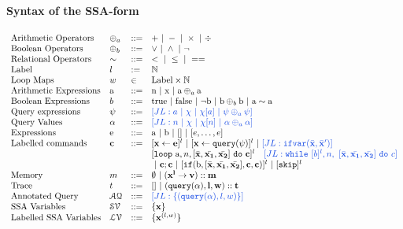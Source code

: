 \documentclass[a4paper,11pt]{article}
\begin{document}
\paragraph{Syntax of the SSA-form}
\[
\begin{array}{llll}
 \mbox{Arithmetic Operators} & \oplus_a & ::= & + ~|~ - ~|~ \times 
%
~|~ \div \\  
  \mbox{Boolean Operators} & \oplus_b & ::= & \lor ~|~ \land ~|~ \neg\\
   \mbox{Relational Operators} & \sim & ::= & < ~|~ \leq ~|~ == \\  
 \mbox{Label} & l & := & \mathbb{N} \\ 
 \mbox{Loop Maps} & w & \in & \mbox{Label} \times \mathbb{N} \\
\mbox{Arithmetic Expressions} & \saexpr & ::= & 
	\textrm{n} ~|~ \textrm{x} ~|~ \saexpr \oplus_a \saexpr  \\
\mbox{Boolean Expressions} & \bexpr & ::= & 
	\textrm{true} ~|~ \textrm{false}  ~|~ \neg \sbexpr
	 ~|~ \sbexpr \oplus_b \sbexpr
	~|~ \saexpr \sim \saexpr 
	\\
\mbox{Query expressions} & \qexpr & ::= 
& \jl{ \aexpr ~|~ \chi ~|~ \chi[\aexpr] ~|~ \qexpr \oplus_a \qexpr} 
\\
\mbox{Query Values} & \qval & ::= 
& \jl{ n ~|~ \chi ~|~ \chi[n] ~|~ \qval \oplus_a  \qval }
\\
\mbox{Expressions} & \sexpr & ::= & \saexpr \sep \sbexpr ~|~ [] ~|~ [\expr, \dots, \expr]
\\	
\mbox{Labelled commands} & \ssa{c} & ::= &   [\assign {\ssa{x}}{ \ssa{\expr}}]^{l} ~|~  [\assign {\ssa{x} } {\ssa{\query(\qexpr)}}]^{l}
%
~|~  {\jl{\eifvar(\bar{\ssa{x}}, \bar{\ssa{x}}')}} \\ 
&&& 
[\eloop ~ \saexpr, n, [\bar{\ssa{x}}, \bar{\ssa{x_1}}, \bar{\ssa{x_2}}] ~ \edo ~ \ssa{c} ]^{l} 
~~~
\jl{\ewhile ~ [ b ]^{l} , n,
~ 
[\bar{\ssa{x}}, \bar{\ssa{x_1}}, \bar{\ssa{x_2}}] 
~ \edo ~  c }
\\
&&&
~|~ \ssa{c};\ssa{c}  
~|~ [\eif(\sbexpr, [\bar{\ssa{x}}, \bar{\ssa{x_1}}, \bar{\ssa{x_2}}] , \ssa{c}, \ssa{c})]^l 
~|~ [\eskip]^{l} \\
\mbox{Memory} & m & ::= & \emptyset ~|~ \ssa{ ({x^{l}} \to v) :: m } \\
%
\mbox{Trace} & t & ::= & [] ~|~ \ssa{{(\query(\qval), l , w ) :: t}} \\
\mbox{Annotated Query} & \mathcal{AQ}  & 
::= & \jl{\{ (\query(\qval), l , w )  \} }
 \\
\mbox{SSA Variables} & \mathcal{SV}  & ::= & \{ \ssa{x} \} \\
\mbox{Labelled SSA Variables} & \mathcal{LV}  & ::= & \{ \ssa{x}^{(l,w)}  \}
\end{array}
\]
\end{document}
